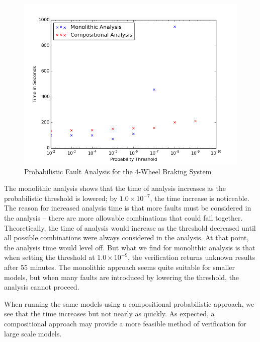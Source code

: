 \begin{figure}[htbp]
	\begin{center}
		\includegraphics[width=.7\textwidth]{images/graphProbWBS_4wheel.png}
	\end{center}
	\vspace{-0.3in}
	\caption{Probabilistic Fault Analysis for the 4-Wheel Braking System}
	\label{fig:graphProbWBS_4wheel}
\end{figure}

The monolithic analysis shows that the time of analysis increases as the probabilistic threshold is lowered; by $1.0 \times 10^{-7}$, the time increase is noticeable. The reason for increased analysis time is that more faults must be considered in the analysis -- there are more allowable combinations that could fail together. Theoretically, the time of analysis would increase as the threshold decreased until all possible combinations were always considered in the analysis. At that point, the analysis time would level off. But what we find for monolithic analysis is that when setting the threshold at $1.0 \times 10^{-9}$, the verification returns unknown results after 55 minutes. The monolithic approach seems quite suitable for smaller models, but when many faults are introduced by lowering the threshold, the analysis cannot proceed.

When running the same models using a compositional probabilistic approach, we see that the time increases but not nearly as quickly. As expected, a compositional approach may provide a more feasible method of verification for large scale models. 

